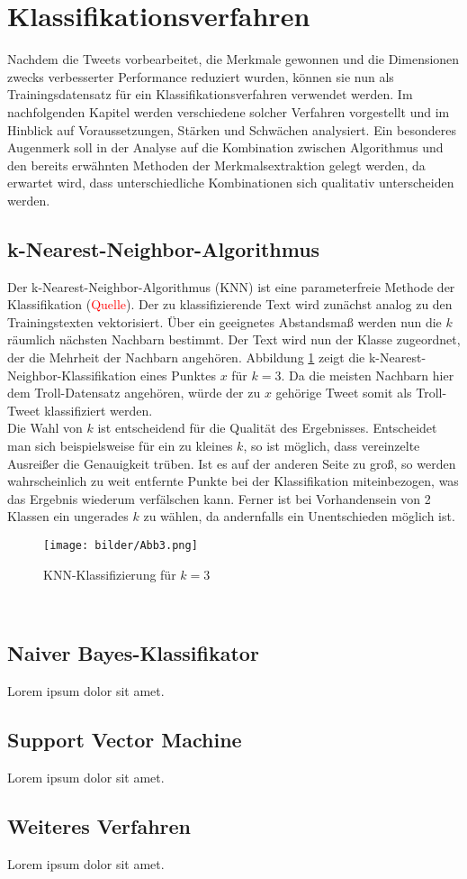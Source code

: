 \section{Klassifikationsverfahren}\raggedbottom
Nachdem die Tweets vorbearbeitet, die Merkmale gewonnen und die Dimensionen zwecks verbesserter Performance reduziert wurden, können sie nun als Trainingsdatensatz für ein Klassifikationsverfahren verwendet werden. Im nachfolgenden Kapitel werden verschiedene solcher Verfahren vorgestellt und im Hinblick auf Voraussetzungen, Stärken und Schwächen analysiert. Ein besonderes Augenmerk soll in der Analyse auf die Kombination zwischen Algorithmus und den bereits erwähnten Methoden der Merkmalsextraktion gelegt werden, da erwartet wird, dass unterschiedliche Kombinationen sich qualitativ unterscheiden werden.  
\subsection{k-Nearest-Neighbor-Algorithmus}
Der k-Nearest-Neighbor-Algorithmus (KNN) ist eine parameterfreie Methode der Klassifikation (\textcolor{red}{Quelle}). Der zu klassifizierende Text wird zunächst analog zu den Trainingstexten vektorisiert. Über ein geeignetes Abstandsmaß werden nun die $k$ räumlich nächsten Nachbarn bestimmt. Der Text wird nun der Klasse zugeordnet, der die Mehrheit der Nachbarn angehören. Abbildung \ref{knn-alg} zeigt die k-Nearest-Neighbor-Klassifikation eines Punktes $x$ für $k=3$. Da die meisten Nachbarn hier dem Troll-Datensatz angehören, würde der zu $x$ gehörige Tweet somit als Troll-Tweet klassifiziert werden.\\
Die Wahl von $k$ ist entscheidend für die Qualität des Ergebnisses. Entscheidet man sich beispielsweise für ein zu kleines $k$, so ist möglich, dass vereinzelte Ausreißer die Genauigkeit trüben. Ist es auf der anderen Seite zu groß, so werden wahrscheinlich zu weit entfernte Punkte bei der Klassifikation miteinbezogen, was das Ergebnis wiederum verfälschen kann. Ferner ist bei Vorhandensein von 2 Klassen ein ungerades $k$ zu wählen, da andernfalls ein Unentschieden möglich ist.\\
\begin{figure}[htb]
	\begin{center}
		\texttt{[image: bilder/Abb3.png]}
		\caption{KNN-Klassifizierung für $k=3$}\label{knn-alg}
	\end{center}
\end{figure}\\ 
\subsection{Naiver Bayes-Klassifikator}
Lorem ipsum dolor sit amet.\pagebreak
\subsection{Support Vector Machine}
Lorem ipsum dolor sit amet.\pagebreak
\subsection{Weiteres Verfahren}
Lorem ipsum dolor sit amet.\pagebreak